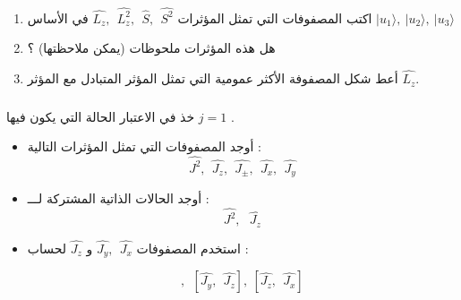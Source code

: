 \documentclass[a4paper,14pt]{article}
\begin{document}
	\begin{enumerate}
		
		\item  
اكتب المصفوفات التي تمثل المؤثرات $\hat{L_{z}},~~\hat{L^{2}_{z}},~~\hat{S},~~\hat{S^{2}}$ في الأساس $|u_{1}\rangle,~|u_{2}\rangle,~	|u_{3}\rangle $ 

		\item هل هذه المؤثرات ملحوظات (يمكن ملاحظتها) ؟
		
		
		\item 
أعط شكل المصفوفة الأكثر عمومية التي تمثل المؤثر المتبادل مع المؤثر $\hat{L_{z}}$.
		
		
	\end{enumerate} 
	

\subsubsection*{}

خذ في الاعتبار الحالة التي يكون فيها $j =1$ .
	
\begin{itemize}
	
   \item 
	
أوجد المصفوفات التي تمثل المؤثرات التالية : 
\begin{equation*}
	\hat{J^{2}},~~\hat{J_{z}},~~\hat{J_{\pm}},~~\hat{J_{x}},~~\hat{J_{y}}
\end{equation*}
	\item 
	
أوجد الحالات الذاتية المشتركة لـــ :
\begin{equation*}
	\hat{J^{2}} ,~~~ \hat{J_{z}}
\end{equation*}

	\item 

استخدم المصفوفات $\hat{J_{y}},~~\hat{J_{x}}$ و $\hat{J_{z}}$ لحساب :

\begin{equation*}
	[\hat{J_{x}},~~\hat{J_{y}}],~~ [\hat{J_{y}},~~\hat{J_{z}}] ,~  [\hat{J_{z}},~~\hat{J_{x}}] 
\end{equation*}
    
	
\end{itemize}
\end{document}
